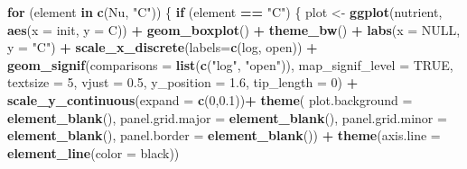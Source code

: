 \documentclass[
]{article}
\newenvironment{Shaded}{\begin{snugshade}}{\end{snugshade}}
\newcommand{\AttributeTok}[1]{\textcolor[rgb]{0.13,0.29,0.53}{#1}}
\newcommand{\ConstantTok}[1]{\textcolor[rgb]{0.56,0.35,0.01}{#1}}
\newcommand{\ControlFlowTok}[1]{\textcolor[rgb]{0.13,0.29,0.53}{\textbf{#1}}}
\newcommand{\DecValTok}[1]{\textcolor[rgb]{0.00,0.00,0.81}{#1}}
\newcommand{\FloatTok}[1]{\textcolor[rgb]{0.00,0.00,0.81}{#1}}
\newcommand{\FunctionTok}[1]{\textcolor[rgb]{0.13,0.29,0.53}{\textbf{#1}}}
\newcommand{\NormalTok}[1]{#1}
\newcommand{\OtherTok}[1]{\textcolor[rgb]{0.56,0.35,0.01}{#1}}
\newcommand{\SpecialCharTok}[1]{\textcolor[rgb]{0.81,0.36,0.00}{\textbf{#1}}}
\newcommand{\StringTok}[1]{\textcolor[rgb]{0.31,0.60,0.02}{#1}}
\begin{document}
\begin{Shaded}
\begin{Highlighting}[]
\ControlFlowTok{for}\NormalTok{ (element }\ControlFlowTok{in} \FunctionTok{c}\NormalTok{(Nu, }\StringTok{"C"}\NormalTok{)) \{}
  \ControlFlowTok{if}\NormalTok{ (element }\SpecialCharTok{==} \StringTok{"C"}\NormalTok{) \{}
\NormalTok{    plot }\OtherTok{\textless{}{-}} \FunctionTok{ggplot}\NormalTok{(nutrient, }\FunctionTok{aes}\NormalTok{(}\AttributeTok{x =}\NormalTok{ init, }\AttributeTok{y =}\NormalTok{ C)) }\SpecialCharTok{+}
      \FunctionTok{geom\_boxplot}\NormalTok{() }\SpecialCharTok{+} 
      \FunctionTok{theme\_bw}\NormalTok{() }\SpecialCharTok{+}
      \FunctionTok{labs}\NormalTok{(}\AttributeTok{x =} \ConstantTok{NULL}\NormalTok{, }\AttributeTok{y =} \StringTok{"C"}\NormalTok{) }\SpecialCharTok{+} 
      \FunctionTok{scale\_x\_discrete}\NormalTok{(}\AttributeTok{labels=}\FunctionTok{c}\NormalTok{(}\StringTok{\textquotesingle{}log\textquotesingle{}}\NormalTok{, }\StringTok{\textquotesingle{}open\textquotesingle{}}\NormalTok{)) }\SpecialCharTok{+}
      \FunctionTok{geom\_signif}\NormalTok{(}\AttributeTok{comparisons =} \FunctionTok{list}\NormalTok{(}\FunctionTok{c}\NormalTok{(}\StringTok{"log"}\NormalTok{, }\StringTok{"open"}\NormalTok{)),}
                  \AttributeTok{map\_signif\_level =} \ConstantTok{TRUE}\NormalTok{,}
                  \AttributeTok{textsize =} \DecValTok{5}\NormalTok{, }\AttributeTok{vjust =} \FloatTok{0.5}\NormalTok{, }\AttributeTok{y\_position =} \FloatTok{1.6}\NormalTok{, }\AttributeTok{tip\_length =} \DecValTok{0}\NormalTok{) }\SpecialCharTok{+} 
      \FunctionTok{scale\_y\_continuous}\NormalTok{(}\AttributeTok{expand =} \FunctionTok{c}\NormalTok{(}\DecValTok{0}\NormalTok{,}\FloatTok{0.1}\NormalTok{))}\SpecialCharTok{+}
      \FunctionTok{theme}\NormalTok{(}
    \AttributeTok{plot.background =} \FunctionTok{element\_blank}\NormalTok{(),}
    \AttributeTok{panel.grid.major =} \FunctionTok{element\_blank}\NormalTok{(),}
    \AttributeTok{panel.grid.minor =} \FunctionTok{element\_blank}\NormalTok{(),}
    \AttributeTok{panel.border =} \FunctionTok{element\_blank}\NormalTok{()) }\SpecialCharTok{+} 
      \FunctionTok{theme}\NormalTok{(}\AttributeTok{axis.line =} \FunctionTok{element\_line}\NormalTok{(}\AttributeTok{color =} \StringTok{\textquotesingle{}black\textquotesingle{}}\NormalTok{))}
    

\end{Highlighting}
\end{Shaded}
\end{document}
